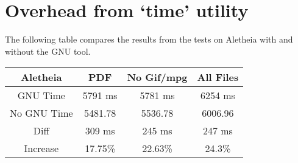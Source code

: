 \section{Overhead from `time' utility}
\label{sec:overHeadApp}
The following table compares the results from the tests on Aletheia with and without the GNU tool.

{\centering
\begin{tabular}{c | c | c | c}
Aletheia & PDF & No Gif/mpg & All Files \\
\hline
GNU Time & 5791 ms & 5781 ms & 6254 ms \\
No GNU Time & 5481.78 & 5536.78 & 6006.96 \\
Diff & 309 ms & 245 ms & 247 ms \\
Increase & 17.75\% & 22.63\% & 24.3\% \\
\end{tabular}
\label{tab:GNUtimeDiff}
\par}

